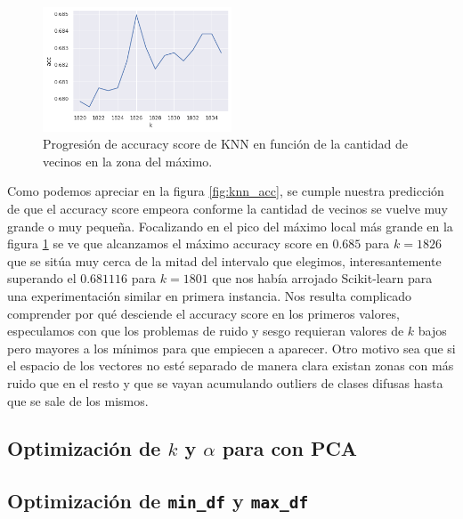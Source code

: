 \begin{figure}[h]
\includegraphics[width=0.5\textwidth]{./img/knn2.png}
\centering
\caption{Progresión de accuracy score de KNN en función de la cantidad de vecinos en la zona del máximo.\label{fig:knn_acc_2}}

\end{figure}

Como podemos apreciar en la figura \ref{fig:knn_acc}, se cumple nuestra predicción de que el accuracy score empeora conforme la cantidad de vecinos se vuelve muy grande o muy pequeña. Focalizando en el pico del máximo local más grande en la figura \ref{fig:knn_acc_2} se ve que alcanzamos el máximo accuracy score en $0.685$ para $k=1826$ que se sitúa muy cerca de la mitad del intervalo que elegimos, interesantemente superando el $0.681116$ para $k=1801$ que nos había arrojado Scikit-learn para una experimentación similar en primera instancia. Nos resulta complicado comprender por qué desciende el accuracy score en los primeros valores, especulamos con que los problemas de ruido y sesgo requieran valores de $k$ bajos pero mayores a los mínimos para que empiecen a aparecer. Otro motivo sea que si el espacio de los vectores no esté separado de manera clara existan zonas con más ruido que en el resto y que se vayan acumulando outliers de clases difusas hasta que se sale de los mismos.

\subsection{Optimización de $k$ y $\alpha$ para \knn{} con PCA}%
\label{sub:alpha_k_knn_pca}


\subsection{Optimización de \texttt{min\_df} y \texttt{max\_df}}%
\label{sub:minmaxdf}


